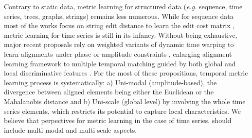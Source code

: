 Contrary to static data, metric learning for structured data (\textit{e.g.} sequence, time series, trees, graphs, strings) remains less numerous. While for sequence data most of the works focus on string edit distance to learn the edit cost matrix \cite{Oncina2006,Bellet2012}, metric learning for time series is still in its infancy. Without being exhaustive, major recent proposals rely on weighted variants of dynamic time warping to learn alignments under phase or amplitude constraints \cite{Reyes2011,Jeong2011,ZhangX.-L.Z.-G.Luo2014}, enlarging alignment learning framework to multiple temporal matching guided by both global and local discriminative features \cite{Frambourg2013a}. For the most of these propositions, temporal metric learning process is systematically: a) Uni-modal (amplitude-based), the divergence between aligned elements being either the Euclidean or the Mahalanobis distance and b) Uni-scale (global level) by involving the whole time series elements, which restricts its potential to capture local characteristics. We believe that perpectives for metric learning in the case of time series, should include multi-modal and multi-scale aspects.


